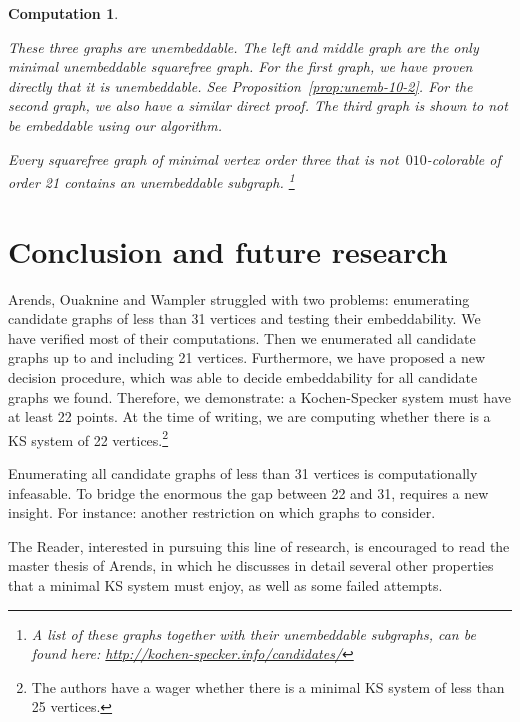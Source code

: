\documentclass[adraft,copyright,creativecommons]{eptcs}
\newcounter{main}
\newtheorem{comp}[main]{Computation}
\theoremstyle{definition}
\theoremstyle{remark}
\begin{document}
\begin{comp}
\begin{center}
    \end{center}
    These three graphs are unembeddable.  The left and middle graph
    are the only minimal unembeddable squarefree graph.
For the first graph, we have proven directly that it is unembeddable.
See Proposition~\ref{prop:unemb-10-2}.
For the second graph, we also have a similar direct proof. The third graph is shown to not be embeddable using our algorithm.

Every squarefree graph of minimal vertex order three that is
not~$010$-colorable of order 21 contains an unembeddable subgraph.%
\footnote{A list of these graphs together with their unembeddable
subgraphs, can be found here:
\url{http://kochen-specker.info/candidates/}}
\end{comp}

\section{Conclusion and future research}
Arends, Ouaknine and Wampler struggled with two problems:
enumerating candidate graphs of less than 31 vertices
and testing their embeddability.
We have verified most of their computations.
Then we enumerated all candidate graphs
up to and including 21 vertices.
Furthermore, we have proposed a new decision procedure,
which was able to decide embeddability
for all candidate graphs we found.
Therefore, we demonstrate: a Kochen-Specker system must have at least
22 points.
At the time of writing,
we are computing
whether there is a KS system of 22 vertices.\footnote{
The authors have a wager whether there is a minimal KS system of less
than 25 vertices.}

Enumerating all candidate graphs of less than 31 vertices
is computationally infeasable.
To bridge the enormous the gap between 22 and 31,
requires a new insight.
For instance: another restriction on which graphs to consider.

The Reader, interested in pursuing this line of research,
is encouraged to read the master thesis\cite{a09} of Arends,
in which he discusses in detail several other
properties that a minimal KS system must enjoy, as well as
some failed attempts.
\end{document}
